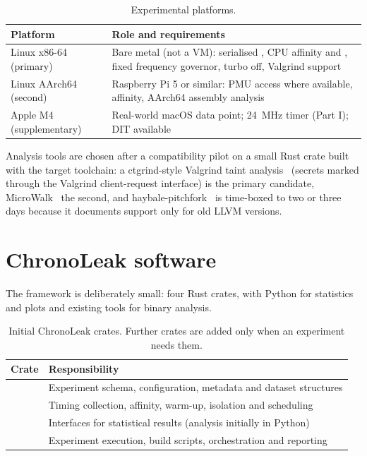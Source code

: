 \begin{table}[htbp]
\centering
\small
\renewcommand{\arraystretch}{1.18}
\begin{tabular}{@{}P{0.24\textwidth}P{0.66\textwidth}@{}}
\toprule
Platform & Role and requirements \\
\midrule
Linux x86-64 (primary) & Bare metal (not a VM): serialised , CPU affinity and , fixed frequency governor, turbo off, Valgrind support \\
Linux AArch64 (second) & Raspberry Pi 5 or similar: PMU access where available, affinity, AArch64 assembly analysis \\
Apple M4 (supplementary) & Real-world macOS data point; 24~MHz timer (Part I); DIT available \\
\bottomrule
\end{tabular}
\caption{Experimental platforms.}
\label{tab:platforms}
\end{table}

Analysis tools are chosen after a compatibility pilot on a small Rust crate built with the target toolchain: a ctgrind-style Valgrind taint analysis~\cite{ctgrind} (secrets marked through the Valgrind client-request interface) is the primary candidate, MicroWalk~\cite{microwalk} the second, and haybale-pitchfork~\cite{pitchfork} is time-boxed to two or three days because it documents support only for old LLVM versions.

\section{ChronoLeak software}

The framework is deliberately small: four Rust crates, with Python for statistics and plots and existing tools for binary analysis.

\begin{table}[htbp]
\centering
\small
\renewcommand{\arraystretch}{1.18}
\begin{tabular}{@{}P{0.22\textwidth}P{0.68\textwidth}@{}}
\toprule
Crate & Responsibility \\
\midrule
{} & Experiment schema, configuration, metadata and dataset structures \\
 & Timing collection, affinity, warm-up, isolation and scheduling \\
 & Interfaces for statistical results (analysis initially in Python) \\
 & Experiment execution, build scripts, orchestration and reporting \\
\bottomrule
\end{tabular}
\caption{Initial ChronoLeak crates. Further crates are added only when an experiment needs them.}
\label{tab:crates}
\end{table}

